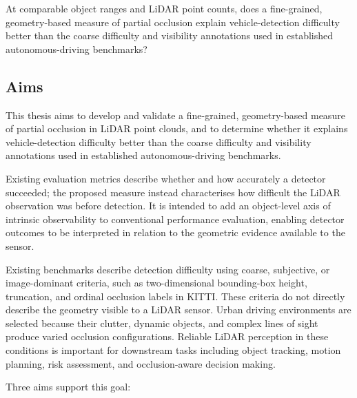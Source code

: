 \documentclass[12pt,a4paper]{article}
\begin{document}
At comparable object ranges and LiDAR point counts, does a fine-grained, geometry-based measure of partial occlusion explain vehicle-detection difficulty better than the coarse difficulty and visibility annotations used in established autonomous-driving benchmarks?


\subsection{Aims}

This thesis aims to develop and validate a fine-grained, geometry-based measure of partial occlusion in LiDAR point clouds, and to determine whether it explains vehicle-detection difficulty better than the coarse difficulty and visibility annotations used in established autonomous-driving benchmarks.


Existing evaluation metrics describe whether and how accurately a detector succeeded; the proposed measure instead characterises how difficult the LiDAR observation was before detection. It is intended to add an object-level axis of intrinsic observability to conventional performance evaluation, enabling detector outcomes to be interpreted in relation to the geometric evidence available to the sensor.

Existing benchmarks describe detection difficulty using coarse, subjective, or image-dominant criteria, such as two-dimensional bounding-box height, truncation, and ordinal occlusion labels in KITTI. These criteria do not directly describe the geometry visible to a LiDAR sensor. Urban driving environments are selected because their clutter, dynamic objects, and complex lines of sight produce varied occlusion configurations. Reliable LiDAR perception in these conditions is important for downstream tasks including object tracking, motion planning, risk assessment, and occlusion-aware decision making.

Three aims support this goal:
\end{document}
